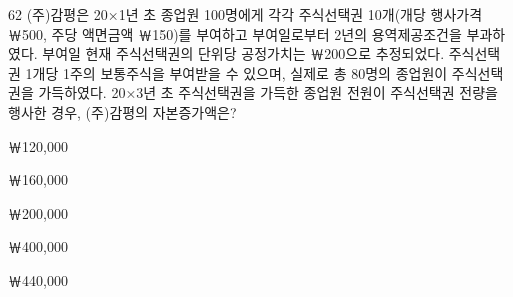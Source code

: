 \begin{question}{62}
(주)감평은 20×1년 초 종업원 100명에게 각각 주식선택권 10개(개당 행사가격 ￦500, 주당 액면금액 ￦150)를 부여하고 부여일로부터 2년의 용역제공조건을 부과하였다. 부여일 현재 주식선택권의 단위당 공정가치는 ￦200으로 추정되었다. 주식선택권 1개당 1주의 보통주식을 부여받을 수 있으며, 실제로 총 80명의 종업원이 주식선택권을 가득하였다. 20×3년 초 주식선택권을 가득한 종업원 전원이 주식선택권 전량을 행사한 경우, (주)감평의 자본증가액은?
\begin{choices}
  \item ￦120,000
  \item ￦160,000
  \item ￦200,000
  \item ￦400,000
  \item ￦440,000
\end{choices}
\end{question}
